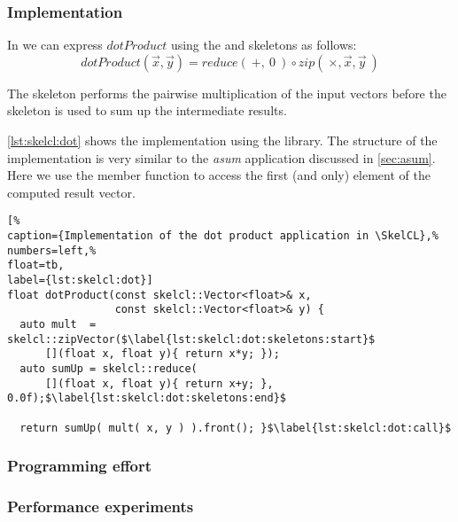 \subsubsection*{\SkelCL Implementation}
In \SkelCL we can express $dotProduct$ using the \zip and \reduce skeletons as follows:
\begin{equation}
  dotProduct(\vec{x}, \vec{y}) = reduce(\ +,\ 0\ ) \circ zip(\ \times, \vec{x}, \vec{y}\ )
\end{equation}

The \zip skeleton performs the pairwise multiplication of the input vectors before the \reduce skeleton is used to sum up the intermediate results.

\autoref{lst:skelcl:dot} shows the implementation using the \SkelCL library.
The structure of the implementation is very similar to the \emph{asum} application discussed in \autoref{sec:asum}.
Here we use the  member function to access the first (and only) element of the computed result vector.

\begin{lstlisting}[%                                                             
caption={Implementation of the dot product application in \SkelCL},%
numbers=left,%
float=tb,
label={lst:skelcl:dot}]
float dotProduct(const skelcl::Vector<float>& x,
                 const skelcl::Vector<float>& y) {
  auto mult  = skelcl::zipVector($\label{lst:skelcl:dot:skeletons:start}$
      [](float x, float y){ return x*y; });
  auto sumUp = skelcl::reduce(
      [](float x, float y){ return x+y; }, 0.0f);$\label{lst:skelcl:dot:skeletons:end}$

  return sumUp( mult( x, y ) ).front(); }$\label{lst:skelcl:dot:call}$
\end{lstlisting}

\subsubsection*{Programming effort}

\subsubsection*{Performance experiments}



